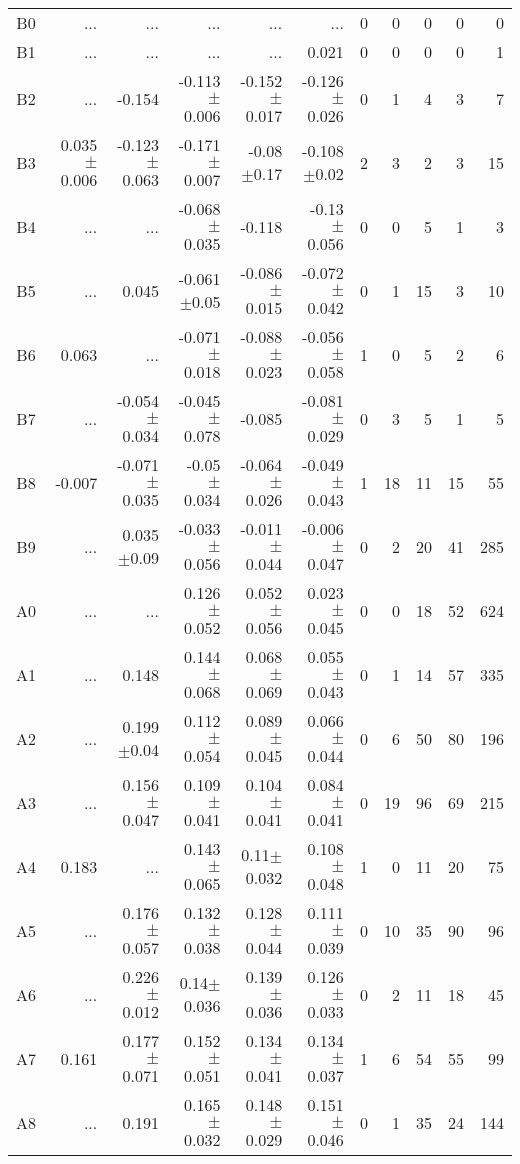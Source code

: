 \begin{table}[t]
\begin{table}[t]
\begin{center}
\begin{tabular}{c|rrrrr|rrrrr}
    B0	&	 ...	&	 ...	&	 ...	&	 ...	&	 ...	&	0	&	0	&	0	&	0	&	0	\\
    B1	&	 ...	&	 ...	&	 ...	&	 ...	&	0.021	&	0	&	0	&	0	&	0	&	1	\\
    B2	&	 ...	&	-0.154	&	-0.113$\pm$0.006	&	-0.152$\pm$0.017	&	-0.126$\pm$0.026	&	0	&	1	&	4	&	3	&	7	\\
    B3	&	0.035$\pm$0.006	&	-0.123$\pm$0.063	&	-0.171$\pm$0.007	&	-0.08$\pm$0.17	&	-0.108$\pm$0.02	&	2	&	3	&	2	&	3	&	15	\\
    B4	&	 ...	&	 ...	&	-0.068$\pm$0.035	&	-0.118	&	-0.13$\pm$0.056	&	0	&	0	&	5	&	1	&	3	\\
    B5	&	 ...	&	0.045	&	-0.061$\pm$0.05	&	-0.086$\pm$0.015	&	-0.072$\pm$0.042	&	0	&	1	&	15	&	3	&	10	\\
    B6	&	0.063	&	 ...	&	-0.071$\pm$0.018	&	-0.088$\pm$0.023	&	-0.056$\pm$0.058	&	1	&	0	&	5	&	2	&	6	\\
    B7	&	 ...	&	-0.054$\pm$0.034	&	-0.045$\pm$0.078	&	-0.085	&	-0.081$\pm$0.029	&	0	&	3	&	5	&	1	&	5	\\
    B8	&	-0.007	&	-0.071$\pm$0.035	&	-0.05$\pm$0.034	&	-0.064$\pm$0.026	&	-0.049$\pm$0.043	&	1	&	18	&	11	&	15	&	55	\\
    B9	&	 ...	&	0.035$\pm$0.09	&	-0.033$\pm$0.056	&	-0.011$\pm$0.044	&	-0.006$\pm$0.047	&	0	&	2	&	20	&	41	&	285	\\
    A0	&	 ...	&	 ...	&	0.126$\pm$0.052	&	0.052$\pm$0.056	&	0.023$\pm$0.045	&	0	&	0	&	18	&	52	&	624	\\
    A1	&	 ...	&	0.148	&	0.144$\pm$0.068	&	0.068$\pm$0.069	&	0.055$\pm$0.043	&	0	&	1	&	14	&	57	&	335	\\
    A2	&	 ...	&	0.199$\pm$0.04	&	0.112$\pm$0.054	&	0.089$\pm$0.045	&	0.066$\pm$0.044	&	0	&	6	&	50	&	80	&	196	\\
    A3	&	 ...	&	0.156$\pm$0.047	&	0.109$\pm$0.041	&	0.104$\pm$0.041	&	0.084$\pm$0.041	&	0	&	19	&	96	&	69	&	215	\\
    A4	&	0.183	&	 ...	&	0.143$\pm$0.065	&	0.11$\pm$0.032	&	0.108$\pm$0.048	&	1	&	0	&	11	&	20	&	75	\\
    A5	&	 ...	&	0.176$\pm$0.057	&	0.132$\pm$0.038	&	0.128$\pm$0.044	&	0.111$\pm$0.039	&	0	&	10	&	35	&	90	&	96	\\
    A6	&	 ...	&	0.226$\pm$0.012	&	0.14$\pm$0.036	&	0.139$\pm$0.036	&	0.126$\pm$0.033	&	0	&	2	&	11	&	18	&	45	\\
    A7	&	0.161	&	0.177$\pm$0.071	&	0.152$\pm$0.051	&	0.134$\pm$0.041	&	0.134$\pm$0.037	&	1	&	6	&	54	&	55	&	99	\\
    A8	&	 ...	&	0.191	&	0.165$\pm$0.032	&	0.148$\pm$0.029	&	0.151$\pm$0.046	&	0	&	1	&	35	&	24	&	144	\\

\end{tabular}
\end{center}
\end{table}
\end{table}
